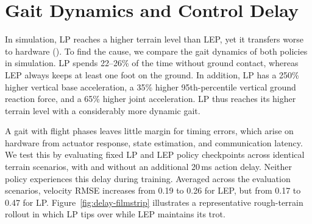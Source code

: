 \documentclass{article}
\newcommand{\baselineTwo}{LP}
\newcommand{\baselineFour}{LEP}
\begin{document}
    \section{Gait Dynamics and Control Delay}
    \label{app:gait-dynamics-delay}

    In simulation, \baselineTwo{} reaches a higher terrain level than \baselineFour{}, yet it transfers worse to hardware (). To find the cause, we compare the gait dynamics of both policies in simulation. \baselineTwo{} spends 22--26\% of the time without ground contact, whereas \baselineFour{} always keeps at least one foot on the ground. In addition, \baselineTwo{} has a 250\% higher vertical base acceleration, a 35\% higher 95th-percentile vertical ground reaction force, and a 65\% higher joint acceleration. \baselineTwo{} thus reaches its higher terrain level with a considerably more dynamic gait.
    
    A gait with flight phases leaves little margin for timing errors, which arise on hardware from actuator response, state estimation, and communication latency. We test this by evaluating fixed \baselineTwo{} and \baselineFour{} policy checkpoints across identical terrain scenarios, with and without an additional 20\,ms action delay. Neither policy experiences this delay during training. Averaged across the evaluation scenarios, velocity RMSE increases from 0.19 to 0.26 for \baselineFour{}, but from 0.17 to 0.47 for \baselineTwo{}. Figure~\ref{fig:delay-filmstrip} illustrates a representative rough-terrain rollout in which \baselineTwo{} tips over while \baselineFour{} maintains its trot.
\end{document}
